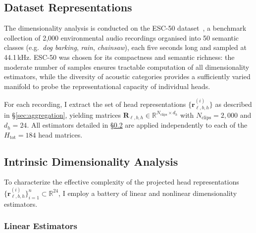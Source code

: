 \subsection{Dataset Representations}
\label{sec:esc50_representations}

The dimensionality analysis is conducted on the ESC-50 dataset~\cite{esc50},
a benchmark collection of 2{,}000 environmental audio recordings organised
into 50 semantic classes (e.g.\ \textit{dog barking}, \textit{rain},
\textit{chainsaw}), each five seconds long and sampled at 44.1\,kHz.
ESC-50 was chosen for its compactness and semantic richness: the moderate
number of samples ensures tractable computation of all dimensionality
estimators, while the diversity of acoustic categories provides a
sufficiently varied manifold to probe the representational capacity of
individual heads.

For each recording, I extract the set of head representations
$\{\mathbf{r}_{\ell,b,h}^{(i)}\}$ as described in \S\ref{sec:aggregation}, yielding matrices
$\mathbf{R}_{\ell,b,h} \in \mathbb{R}^{N_{\text{clips}} \times d_h}$ with $N_{\text{clips}} = 2{,}000$
and $d_h = 24$. All estimators detailed in
\S\ref{sec:dimensionality_method} are applied independently to each
of the $H_{\mathrm{tot}} = 184$ head matrices.

\subsection{Intrinsic Dimensionality Analysis}
\label{sec:dimensionality_method}

To characterize the effective complexity of the projected head representations
$\{\mathbf{r}_{\ell,b,h}^{(i)}\}_{i=1}^{n} \subset \mathbb{R}^{24}$, I employ a battery of
linear and nonlinear dimensionality estimators.

\subsubsection{Linear Estimators}

